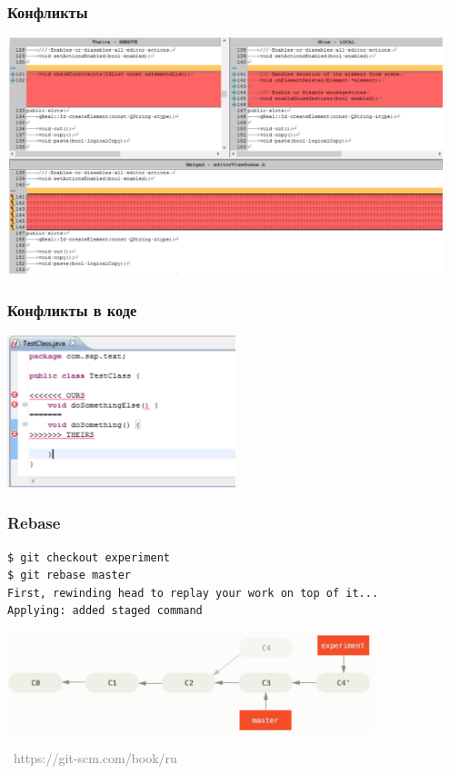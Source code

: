 \documentclass[xetex,mathserif,serif]{beamer}
\newcommand{\attribution}[1] {
\vspace{-5mm}\begin{flushright}\begin{scriptsize}\textcolor{gray}{\textcopyright\, #1}\end{scriptsize}\end{flushright}
}
\begin{document}
	\begin{frame}
		\frametitle{Конфликты}
		\begin{center}
			\includegraphics[width=0.95\textwidth]{conflicts.png}
		\end{center}
	\end{frame}

	\begin{frame}
		\frametitle{Конфликты в коде}
		\begin{center}
			\includegraphics[width=0.5\textwidth]{conflictsInCode.png}
		\end{center}
	\end{frame}

	\begin{frame}[fragile]
		\frametitle{Rebase}
		\begin{verbatim}
$ git checkout experiment
$ git rebase master
First, rewinding head to replay your work on top of it...
Applying: added staged command
		\end{verbatim}
		\begin{center}
			\includegraphics[width=0.8\textwidth]{rebase.png}
			\attribution{https://git-scm.com/book/ru}
		\end{center}
	\end{frame}
\end{document}
